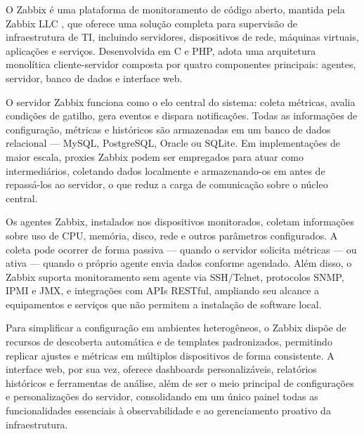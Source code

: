 {\color{red}

O Zabbix é uma plataforma de monitoramento de código aberto, mantida pela Zabbix LLC \citep{zabbix2025}, que oferece uma solução completa para supervisão de infraestrutura de TI, incluindo servidores, dispositivos de rede, máquinas virtuais, aplicações e serviços. Desenvolvida em C e PHP, adota uma arquitetura monolítica cliente-servidor composta por quatro componentes principais: agentes, servidor, banco de dados e interface web.

O servidor Zabbix funciona como o elo central do sistema: coleta métricas, avalia condições de gatilho, gera eventos e dispara notificações. Todas as informações de configuração, métricas e históricos são armazenadas em um banco de dados relacional — MySQL, PostgreSQL, Oracle ou SQLite. Em implementações de maior escala, proxies Zabbix podem ser empregados para atuar como intermediários, coletando dados localmente e armazenando-os em  antes de repassá-los ao servidor, o que reduz a carga de comunicação sobre o núcleo central.

Os agentes Zabbix, instalados nos dispositivos monitorados, coletam informações sobre uso de CPU, memória, disco, rede e outros parâmetros configurados. A coleta pode ocorrer de forma passiva — quando o servidor solicita métricas — ou ativa — quando o próprio agente envia dados conforme agendado. Além disso, o Zabbix suporta monitoramento sem agente via SSH/Telnet, protocolos SNMP, IPMI e JMX, e integrações com APIs RESTful, ampliando seu alcance a equipamentos e serviços que não permitem a instalação de software local.

Para simplificar a configuração em ambientes heterogêneos, o Zabbix dispõe de recursos de descoberta automática e de templates padronizados, permitindo replicar ajustes e métricas em múltiplos dispositivos de forma consistente. A interface web, por sua vez, oferece dashboards personalizáveis, relatórios históricos e ferramentas de análise, além de ser o meio principal de configurações e personalizações do servidor, consolidando em um único painel todas as funcionalidades essenciais à observabilidade e ao gerenciamento proativo da infraestrutura.

}
